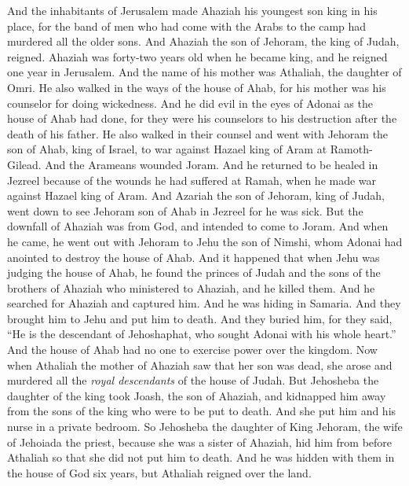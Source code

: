 \begin{biblechapter} %
 And the inhabitants of Jerusalem made Ahaziah his youngest son king in his place, for the band of men who had come with the Arabs to the camp had murdered all the older sons. And Ahaziah the son of Jehoram, the king of Judah, reigned.
\verse Ahaziah was forty-two years old when he became king, and he reigned one year in Jerusalem. And the name of his mother was Athaliah, the daughter of Omri.
\verse He also walked in the ways of the house of Ahab, for his mother was his counselor for doing wickedness.
\verse And he did evil in the eyes of Adonai as the house of Ahab had done, for they were his counselors to his destruction after the death of his father.
\verse He also walked in their counsel and went with Jehoram the son of Ahab, king of Israel, to war against Hazael king of Aram at Ramoth-Gilead. And the Arameans wounded Joram.
\verse And he returned to be healed in Jezreel because of the wounds he had suffered at Ramah, when he made war against Hazael king of Aram. And Azariah the son of Jehoram, king of Judah, went down to see Jehoram son of Ahab in Jezreel for he was sick.
\verse But the downfall of Ahaziah was from God, and intended to come to Joram. And when he came, he went out with Jehoram to Jehu the son of Nimshi, whom Adonai had anointed to destroy the house of Ahab.
\verse And it happened that when Jehu was judging the house of Ahab, he found the princes of Judah and the sons of the brothers of Ahaziah who ministered to Ahaziah, and he killed them.
\verse And he searched for Ahaziah and captured him. And he was hiding in Samaria. And they brought him to Jehu and put him to death. And they buried him, for they said, “He is the descendant of Jehoshaphat, who sought Adonai with his whole heart.” And the house of Ahab had no one to exercise power over the kingdom.
 Now when Athaliah the mother of Ahaziah saw that her son was dead, she arose and murdered all the \textit{royal descendants} of the house of Judah.
\verse But Jehosheba the daughter of the king took Joash, the son of Ahaziah, and kidnapped him away from the sons of the king who were to be put to death. And she put him and his nurse in a private bedroom. So Jehosheba the daughter of King Jehoram, the wife of Jehoiada the priest, because she was a sister of Ahaziah, hid him from before Athaliah so that she did not put him to death.
\verse And he was hidden with them in the house of God six years, but Athaliah reigned over the land.
\end{biblechapter}

